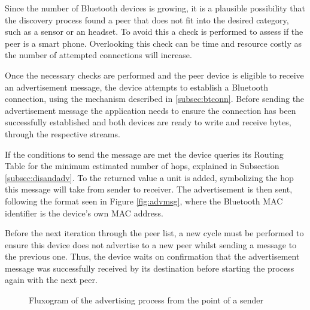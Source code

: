 Since the number of Bluetooth devices is growing, it is a plausible possibility that the discovery process found a peer that does not fit into the desired category, such as a sensor or an headset. To avoid this a check is performed to assess if the peer is a smart phone. Overlooking this check can be time and resource costly as the number of attempted connections will increase.

Once the necessary checks are performed and the peer device is eligible to receive an advertisement message, the device attempts to establish a Bluetooth connection, using the mechanism described in \ref{subsec:btconn}. Before sending the advertisement message the application needs to ensure the connection has been successfully established and both devices are ready to write and receive bytes, through the respective streams.

If the conditions to send the message are met the device queries its Routing Table for the minimum estimated number of hops, explained in Subsection \ref{subsec:disandadv}. To the returned value a unit is added, symbolizing the hop this message will take from sender to receiver. The advertisement is then sent, following the format seen in Figure \ref{fig:advmsg}, where the Bluetooth \gls{MAC} identifier is the device's own \gls{MAC} address.

Before the next iteration through the peer list, a new cycle must be performed to ensure this device does not advertise to a new peer whilst sending a message to the previous one. Thus, the device waits on confirmation that the advertisement message was successfully received by its destination before starting the process again with the next peer.

\begin{figure}[ht]
   \noindent{}
	\caption{\label{fig:advflux} Fluxogram of the advertising process from the point of a sender}
\end{figure}

